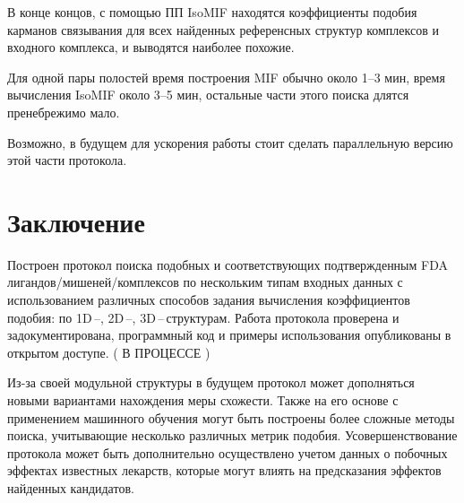 \documentclass[a4paper,14pt]{article}         %
\newcommand{\sic}[1]{\LARGE\color{orange}{#1}\color{black}\Large}
\begin{document}
В конце концов, с помощью ПП IsoMIF находятся коэффициенты подобия карманов связывания для всех найденных референсных структур комплексов и входного комплекса, и выводятся наиболее похожие.

\sic{ПРИМЕР}

Для одной пары полостей время построения MIF обычно около 1--3 мин, время вычисления IsoMIF около 3--5 мин, остальные части этого поиска длятся пренебрежимо мало.

Возможно, в будущем для ускорения работы стоит сделать параллельную версию этой части протокола.

\newpage
\section{Заключение}
Построен протокол поиска подобных и соответствующих подтвержденным FDA лигандов/мишеней/комплексов по нескольким типам входных данных с использованием различных способов задания вычисления коэффициентов подобия: по 1D\,--, 2D\,--, 3D\,--\,структурам. Работа протокола проверена и задокументирована, программный код и примеры использования опубликованы в открытом доступе. (\color{orange} В ПРОЦЕССЕ \color{black})

Из-за своей модульной структуры в будущем протокол может дополняться новыми вариантами нахождения меры схожести. Также на его основе с применением машинного обучения могут быть построены более сложные методы поиска, учитывающие несколько различных метрик подобия. Усовершенствование протокола может быть дополнительно осуществлено учетом данных о побочных эффектах известных лекарств, которые могут влиять на предсказания эффектов найденных кандидатов.


\newpage
\printbibliography[heading=bibintoc, title=Список использованных источников]
\end{document}
